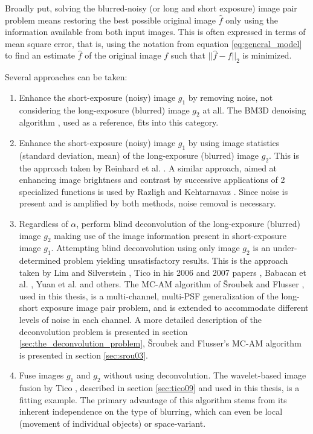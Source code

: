 \documentclass[12pt,notitlepage]{report}
\begin{document}
Broadly put, solving the blurred-noisy (or long and short exposure) image pair problem means restoring the best possible original image $\hat{f}$ only using the information available from both input images. This is often expressed in terms of mean square error, that is, using the notation from equation \ref{eq:general_model} to find an estimate $\hat{f}$ of the original image $f$ such that $|| \hat{f} - f ||_2$ is minimized.

Several approaches can be taken:
\begin{enumerate}
	\item Enhance the short-exposure (noisy) image $g_1$ by removing noise, not considering the long-exposure (blurred) image $g_2$ at all. The BM3D denoising algorithm \cite{bm3d}, used as a reference, fits into this category.
	\item Enhance the short-exposure (noisy) image $g_1$ by using image statistics (standard deviation, mean) of the long-exposure (blurred) image $g_2$. This is the approach taken by Reinhard et al. \cite{rein01}. A similar approach, aimed at enhancing image brightness and contrast by successive applications of 2 specialized functions is used by Razligh and Kehtarnavaz \cite{razl07}. Since noise is present and is amplified by both methods, noise removal is necessary. 
	\item Regardless of $\alpha$, perform blind deconvolution of the long-exposure (blurred) image $g_2$ making use of the image information present in short-exposure image $g_1$. Attempting blind deconvolution using only image $g_2$ is an under-determined problem yielding unsatisfactory results. This is the approach taken by Lim and Silverstein \cite{lim08}, Tico in his 2006 and 2007 papers \cite{tico06} \cite{tico07},  Babacan et al. \cite{baba09}, Yuan et al. \cite{yuan07} and others. The MC-AM algorithm of Šroubek and Flusser \cite{srou03}, used in this thesis, is a multi-channel, multi-PSF generalization of the long-short exposure image pair problem, and is extended to accommodate different levels of noise in each channel. A more detailed description of the deconvolution problem is presented in section \ref{sec:the_deconvolution_problem}, Šroubek and Flusser's MC-AM algorithm is presented in section \ref{sec:srou03}.
	\item Fuse images $g_1$ and $g_2$ without using deconvolution. The wavelet-based image fusion by Tico \cite{tico09}, described in section \ref{sec:tico09} and used in this thesis, is a fitting example. The primary advantage of this algorithm stems from its inherent independence on the type of blurring, which can even be local (movement of individual objects) or space-variant.
\end{enumerate}  
\end{document}
